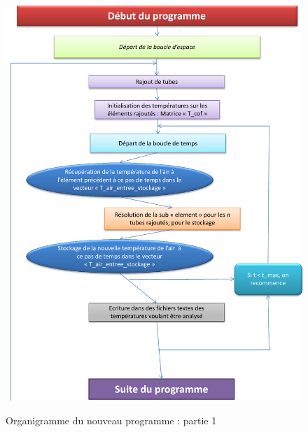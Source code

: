 \begin{figure}[!h]
\centering
\caption{Organigramme du nouveau programme : partie 1}
\includegraphics[scale=0.8]{PHOTO/Organigramme_dernier_prog_1.pdf}
\label{dernier_prog_1}
\end{figure}



